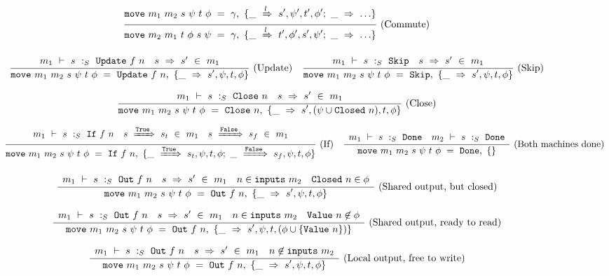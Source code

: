 
\begin{figure*}

$$
\frac {\displaystyle 
    \mathtt{move}~m_1~m_2~s~\psi~t~\phi~=~\gamma,~\{\_~\xRightarrow{l}~s',\psi',t',\phi';~ \_~\Rightarrow~\ldots \}
} {\displaystyle 
    \mathtt{move}~m_2~m_1~t~\phi~s~\psi
    ~=~\gamma,~\{\_~\xRightarrow{l}~t',\phi',s',\psi';~ \_~\Rightarrow~\ldots \}
} \ 
\textrm{(Commute)}
$$

$$
\frac {\displaystyle 
    \begin{array}{lr}  m_1 ~\vdash~ s ~:_S~ \mathtt{Update}~f~n  &  s ~\Rightarrow~ s' ~\in~m_1  \end{array}
} {\displaystyle 
    \mathtt{move}~m_1~m_2~s~\psi~t~\phi~=~\mathtt{Update}~f~n,~\{\_~\Rightarrow~s',\psi,t,\phi\}
} \ 
\textrm{(Update)}
\quad
\frac {\displaystyle 
    \begin{array}{lr}  m_1 ~\vdash~ s ~:_S~ \mathtt{Skip}  &  s ~\Rightarrow~ s' ~\in~m_1  \end{array}
} {\displaystyle 
    \mathtt{move}~m_1~m_2~s~\psi~t~\phi~=~\mathtt{Skip},~\{\_~\Rightarrow~s',\psi,t,\phi\}
} \ 
\textrm{(Skip)}
$$

$$
\frac {\displaystyle 
    \begin{array}{lr}  m_1 ~\vdash~ s ~:_S~ \mathtt{Close}~n  &  s ~\Rightarrow~ s' ~\in~m_1  \end{array}
} {\displaystyle 
    \mathtt{move}~m_1~m_2~s~\psi~t~\phi~=~\mathtt{Close}~n,~\{\_~\Rightarrow~s',(\psi \cup \mathtt{Closed}~n), t, \phi\}
} \ 
\textrm{(Close)}
$$

$$
\frac {\displaystyle 
    \begin{array}{lcr}  m_1 ~\vdash~ s ~:_S~ \mathtt{If}~f~n  &  s ~\xRightarrow{\mathtt{True}}~ s_t ~\in~m_1  &  s ~\xRightarrow{\mathtt{False}}~ s_f ~\in~m_1  \end{array}
} {\displaystyle 
    \mathtt{move}~m_1~m_2~s~\psi~t~\phi~=~\mathtt{If}~f~n,~\{ \_~\xRightarrow{\mathtt{True}}~s_t,\psi,t,\phi
         ;~
          \_~\xRightarrow{\mathtt{False}}~s_f,\psi,t,\phi
        \}
} \ 
\textrm{(If)}
\quad
\frac {\displaystyle 
    \begin{array}{lr}  m_1 ~\vdash~ s ~:_S~ \mathtt{Done}  &  m_2 ~\vdash~ s ~:_S~ \mathtt{Done}  \end{array}
} {\displaystyle 
    \mathtt{move}~m_1~m_2~s~\psi~t~\phi~=~\mathtt{Done},~\{\}
} \ 
\textrm{(Both machines done)}
$$

$$
\frac {\displaystyle 
    \begin{array}{lccr}  m_1 ~\vdash~ s ~:_S~ \mathtt{Out}~f~n  &  s ~\Rightarrow~ s' ~\in~m_1  &  n \in \mathtt{inputs}~m_2  &  \mathtt{Closed}~n \in \phi  \end{array}
} {\displaystyle 
    \mathtt{move}~m_1~m_2~s~\psi~t~\phi~=~\mathtt{Out}~f~n,~\{\_~\Rightarrow~s',\psi,t,\phi\}
} \ 
\textrm{(Shared output, but closed)}
$$

$$
\frac {\displaystyle 
    \begin{array}{lccr}  m_1 ~\vdash~ s ~:_S~ \mathtt{Out}~f~n  &  s ~\Rightarrow~ s' ~\in~m_1  &  n \in \mathtt{inputs}~m_2  &  \mathtt{Value}~n \not\in \phi  \end{array}
} {\displaystyle 
    \mathtt{move}~m_1~m_2~s~\psi~t~\phi~=~\mathtt{Out}~f~n,~\{\_~\Rightarrow~s', \psi, t, (\phi \cup \{ \mathtt{Value}~n \}) \}
} \ 
\textrm{(Shared output, ready to read)}
$$

$$
\frac {\displaystyle 
    \begin{array}{lcr}  m_1 ~\vdash~ s ~:_S~ \mathtt{Out}~f~n  &  s ~\Rightarrow~ s' ~\in~m_1  &  n \not\in \mathtt{inputs}~m_2  \end{array}
} {\displaystyle 
    \mathtt{move}~m_1~m_2~s~\psi~t~\phi~=~\mathtt{Out}~f~n,~\{\_~\Rightarrow~s',\psi,t,\phi\}
} \ 
\textrm{(Local output, free to write)}
$$


\end{figure*}
